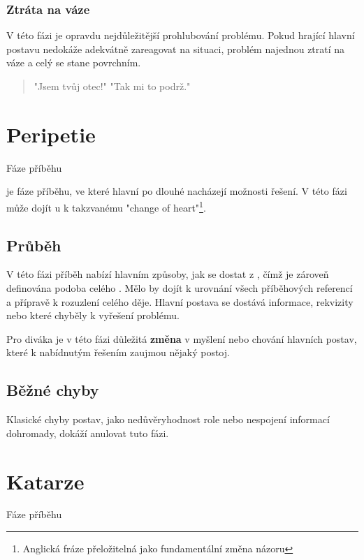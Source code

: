 \subsubsection{ Ztráta na váze } V této fázi je opravdu nejdůležitější prohlubování problému. Pokud  hrající hlavní postavu nedokáže adekvátně zareagovat na situaci, problém najednou ztratí na váze a celý  se stane povrchním. 
 
\begin{quote} 
"Jsem tvůj otec!" 
"Tak mi to podrž." 
\end{quote} 
 
 
 
 
\needspace{5cm} \section{Peripetie} \label{peripetie} {{Fáze příběhu}} 
 
 je fáze příběhu, ve které hlavní  po dlouhé  nacházejí možnosti řešení. V této fázi může dojít u  k takzvanému "change of heart"\footnote{Anglická fráze přeložitelná jako fundamentální změna názoru}. 
 
\subsection{ Průběh } V této fázi příběh nabízí hlavním  způsoby, jak se dostat z , čímž je zároveň definována podoba  celého . Mělo by dojít k urovnání všech příběhových referencí a přípravě k rozuzlení celého děje. Hlavní postava se dostává informace, rekvizity nebo které chyběly k vyřešení problému. 
 
Pro diváka je v této fázi důležitá \textbf{změna}{} v myšlení nebo chování hlavních postav, které k nabídnutým řešením zaujmou nějaký postoj. 
 
\subsection{ Běžné chyby }  
Klasické chyby postav, jako nedůvěryhodnost role nebo nespojení informací dohromady, dokáží anulovat tuto fázi. 
 
  
 
 
\needspace{5cm} \section{Katarze} \label{katarze} {{Fáze příběhu}} 
 
